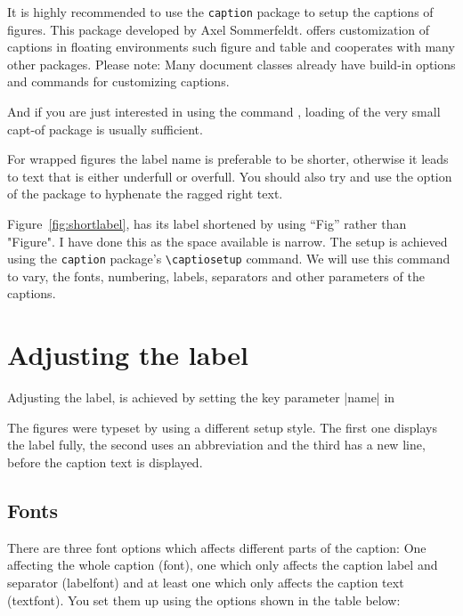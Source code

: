 It is highly recommended to use the \texttt{caption} package to setup the captions of figures. This package developed by Axel Sommerfeldt. offers customization of captions in floating environments such
figure and table and cooperates with many other packages.
Please note: Many document classes already have build-in options and commands
for customizing captions.

And if you are just interested in using the
command , loading of the very small capt-of package is usually sufficient.

For wrapped figures the label name is preferable to be shorter, otherwise it leads to text that is either underfull or overfull. You should also try and use the  option of the  package to hyphenate the ragged right text.



Figure~\ref{fig:shortlabel}, has its label shortened by using ``Fig'' rather than "Figure". I have done this as the space available is narrow. The setup is achieved using the \texttt{caption} package's \verb+\captiosetup+ command. We will use this command to vary, the fonts, numbering, labels, separators and other parameters of the captions.

\section{Adjusting the label\hfill\hfill}%

Adjusting the label, is achieved by setting the key parameter |name| in  

\begin{teXXX}
\captionsetup{name=Figure}
\end{teXXX}



The figures were typeset by using a different setup style. The first one displays the  label fully, the second uses an abbreviation and the third has a new line, before the caption text is displayed.

\subsection{Fonts}

There are three font options which affects different parts of the caption: One affecting the
whole caption (font), one which only affects the caption label and separator (labelfont) and at least one which only affects the caption text (textfont). You set them up using the options shown in the table below:

